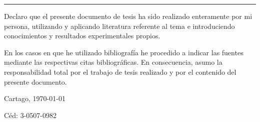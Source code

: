 \thispagestyle{empty}

\rule{10mm}{0pt}

\vfill

Declaro que el presente documento de tesis ha sido realizado enteramente
por mi persona, utilizando y aplicando literatura referente al tema e
introduciendo conocimientos y resultados experimentales propios.

En los casos en que he utilizado bibliografía he procedido a indicar las
fuentes mediante las respectivas citas bibliográficas.  En consecuencia,
asumo la responsabilidad total por el trabajo de tesis realizado y por
el contenido del presente documento.



\vspace*{8mm}

\begin{flushright}
  \thesisAuthor\par
  Cartago, \today\par
  Céd: 3-0507-0982
\end{flushright}

\cleardoublepage

